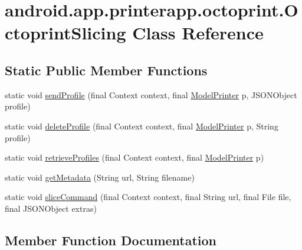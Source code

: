 \hypertarget{classandroid_1_1app_1_1printerapp_1_1octoprint_1_1_octoprint_slicing}{}\section{android.\+app.\+printerapp.\+octoprint.\+Octoprint\+Slicing Class Reference}
\label{classandroid_1_1app_1_1printerapp_1_1octoprint_1_1_octoprint_slicing}
\subsection*{Static Public Member Functions}
\begin{DoxyCompactItemize}
\item 
static void \hyperlink{classandroid_1_1app_1_1printerapp_1_1octoprint_1_1_octoprint_slicing_a7cc98d585ce1fece2f2ddc77bd19a5db}{send\+Profile} (final Context context, final \hyperlink{classandroid_1_1app_1_1printerapp_1_1model_1_1_model_printer}{Model\+Printer} p, J\+S\+O\+N\+Object profile)
\item 
static void \hyperlink{classandroid_1_1app_1_1printerapp_1_1octoprint_1_1_octoprint_slicing_af71dd05ee71853ff2aeefa210efb8b16}{delete\+Profile} (final Context context, final \hyperlink{classandroid_1_1app_1_1printerapp_1_1model_1_1_model_printer}{Model\+Printer} p, String profile)
\item 
static void \hyperlink{classandroid_1_1app_1_1printerapp_1_1octoprint_1_1_octoprint_slicing_a022f84b1835c18124eaf103d1d3f7108}{retrieve\+Profiles} (final Context context, final \hyperlink{classandroid_1_1app_1_1printerapp_1_1model_1_1_model_printer}{Model\+Printer} p)
\item 
static void \hyperlink{classandroid_1_1app_1_1printerapp_1_1octoprint_1_1_octoprint_slicing_ac05a919b31021138c521e1e74b81f95d}{get\+Metadata} (String url, String filename)
\item 
static void \hyperlink{classandroid_1_1app_1_1printerapp_1_1octoprint_1_1_octoprint_slicing_ab1fcf508a6a18eadd7bfe7847c7b5d47}{slice\+Command} (final Context context, final String url, final File file, final J\+S\+O\+N\+Object extras)
\end{DoxyCompactItemize}


\subsection{Member Function Documentation}
\mbox{\label{classandroid_1_1app_1_1printerapp_1_1octoprint_1_1_octoprint_slicing_af71dd05ee71853ff2aeefa210efb8b16}} 
